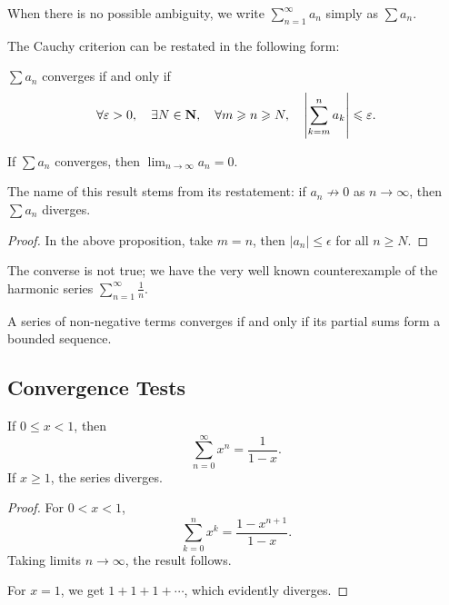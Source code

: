 \begin{notation}
When there is no possible ambiguity, we write $\displaystyle\sum_{n=1}^{\infty}a_n$ simply as $\sum a_n$.
\end{notation}

The Cauchy criterion can be restated in the following form:

\begin{proposition}
$\sum a_n$ converges if and only if
\[\forall\varepsilon>0,\quad\exists N\in\mathbf N,\quad\forall m\geqslant n\geqslant N,\quad\left|\sum_{k=m}^n a_k\right|\leqslant\varepsilon.\]
\end{proposition}

\begin{corollary}
If $\sum a_n$ converges, then $\displaystyle\lim_{n\to\infty}a_n=0$.
\end{corollary}

The name of this result stems from its restatement: if $a_n\not\to0$ as $n\to\infty$, then $\sum a_n$ diverges. 

\begin{proof}
In the above proposition, take $m=n$, then $|a_n|\le\epsilon$ for all $n\ge N$.
\end{proof}

\begin{remark}
The converse is not true; we have the very well known counterexample of the harmonic series $\displaystyle\sum_{n=1}^\infty\frac{1}{n}$.
\end{remark}

\begin{proposition}
A series of non-negative terms converges if and only if its partial sums form a bounded sequence.
\end{proposition}

\subsection{Convergence Tests}
\begin{proposition}
If $0\le x<1$, then
\[\sum_{n=0}^{\infty}x^n=\frac{1}{1-x}.\]
If $x\ge1$, the series diverges.
\end{proposition}

\begin{proof}
For $0<x<1$,
\[\sum_{k=0}^{n}x^k=\frac{1-x^{n+1}}{1-x}.\]
Taking limits $n\to\infty$, the result follows.

For $x=1$, we get $1+1+1+\cdots$, which evidently diverges.
\end{proof}

